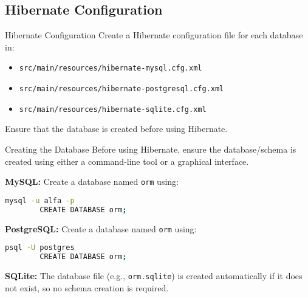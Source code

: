 \documentclass[aspectratio=169, table]{beamer}
\begin{document}
\subsection{Hibernate Configuration}

\begin{frame}{Hibernate Configuration}
	\vspace{20pt}
	Create a Hibernate configuration file for each database in:
	\begin{itemize}
		\item \texttt{src/main/resources/hibernate-mysql.cfg.xml}
		\item \texttt{src/main/resources/hibernate-postgresql.cfg.xml}
		\item \texttt{src/main/resources/hibernate-sqlite.cfg.xml}
	\end{itemize}
	
	Ensure that the database is created before using Hibernate.
\end{frame}

\begin{frame}[fragile]{Creating the Database}
	\vspace{20pt}
	Before using Hibernate, ensure the database/schema is created using either a command-line tool or a graphical interface.
	
	\textbf{MySQL:}  
	Create a database named \texttt{orm} using:
	\begin{lstlisting}[language=bash]
		mysql -u alfa -p
		CREATE DATABASE orm;
	\end{lstlisting}
	
	\textbf{PostgreSQL:}  
	Create a database named \texttt{orm} using:
	\begin{lstlisting}[language=bash]
		psql -U postgres
		CREATE DATABASE orm;
	\end{lstlisting}
	
	\textbf{SQLite:}  
	The database file (e.g., \texttt{orm.sqlite}) is created automatically if it does not exist, so no schema creation is required.
\end{frame}
\end{document}
